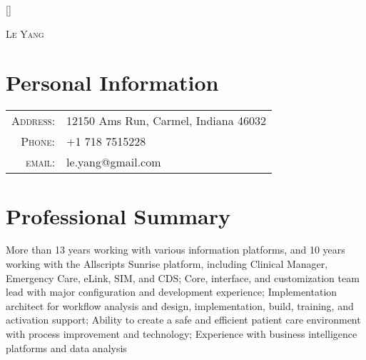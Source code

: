 \documentclass[letter,11pt,DIV=20]{scrartcl}
\begin{document}
\pagestyle{empty}
\titleformat{\section}{\Large\scshape\raggedright}{}{0em}{}[\titlerule]
\titlespacing{\section}{0pt}{3pt}{0.75em}



\par{\centering
		{\Huge \textsc{Le Yang}
	}\bigskip\par}
	
\section{Personal Information}
\begin{tabular}{rl}
    \textsc{Address:}   & 12150 Ams Run, Carmel, Indiana 46032 
    \\ \textsc{Phone:}     & +1 718 7515228
    \\ \textsc{email:}     & le.yang@gmail.com\\
\end{tabular}

\section{Professional Summary}
More than 13 years working with various information platforms, and 10 years working with the Allscripts Sunrise platform, including Clinical Manager, Emergency Care, eLink, SIM, and CDS; 
Core, interface, and customization team lead with major configuration and development experience; 
Implementation architect for workflow analysis and design, implementation, build, training, and activation support; 
Ability to create a safe and efficient patient care environment with process improvement and technology; 
Experience with business intelligence platforms and data analysis

\end{document}
